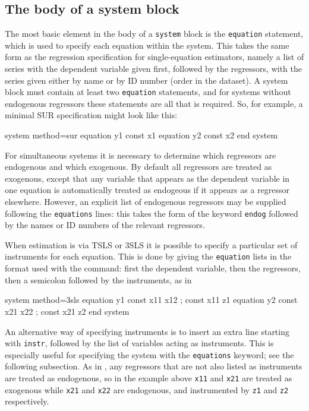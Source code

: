 \subsection{The body of a system block}

The most basic element in the body of a \texttt{system} block is the
\texttt{equation} statement, which is used to specify each equation
within the system. This takes the same form as the regression
specification for single-equation estimators, namely a list of series
with the dependent variable given first, followed by the regressors,
with the series given either by name or by ID number (order in the
dataset). A system block must contain at least two \texttt{equation}
statements, and for systems without endogenous regressors these
statements are all that is required. So, for example, a minimal
SUR specification might look like this:

\begin{code}
system method=sur
  equation y1 const x1
  equation y2 const x2
end system
\end{code}

For simultaneous systems it is necessary to determine which regressors
are endogenous and which exogenous. By default all regressors are
treated as exogenous, except that any variable that appears as the
dependent variable in one equation is automatically treated as
endogeous if it appears as a regressor elsewhere. However, an explicit
list of endogenous regressors may be supplied following the
\texttt{equations} lines: this takes the form of the keyword
\texttt{endog} followed by the names or ID numbers of the relevant
regressors.

When estimation is via TSLS or 3SLS it is possible to specify a
particular set of instruments for each equation. This is done by
giving the \texttt{equation} lists in the format used with the
 command: first the dependent variable, then the
regressors, then a semicolon followed by the instruments, as in

\begin{code}
system method=3sls
  equation y1 const x11 x12 ; const x11 z1
  equation y2 const x21 x22 ; const x21 z2
end system
\end{code}

An alternative way of specifying instruments is to insert an extra
line starting with \texttt{instr}, followed by the list of variables
acting as instruments. This is especially useful for specifying the
system with the \texttt{equations} keyword; see the following
subsection.  As in , any regressors that are not also listed
as instruments are treated as endogenous, so in the example above
\texttt{x11} and \texttt{x21} are treated as exogenous while
\texttt{x21} and \texttt{x22} are endogenous, and instrumented by
\texttt{z1} and \texttt{z2} respectively.

